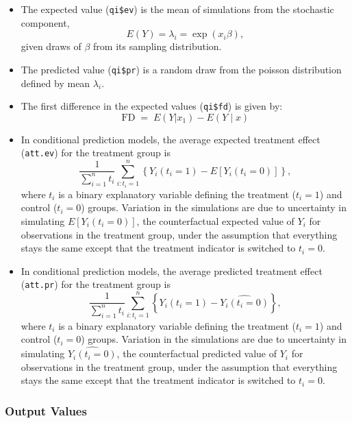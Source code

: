 \begin{itemize}
  
\item The expected value ({\tt qi\$ev}) is the mean of simulations
  from the stochastic component, $$E(Y) = \lambda_i =  \exp(x_i
  \beta),$$ given draws of $\beta$ from its sampling distribution.  
  
\item The predicted value ({\tt qi\$pr}) is a random draw from the
  poisson distribution defined by mean $\lambda_i$.

\item The first difference in the expected values ({\tt qi\$fd}) is given by:
\begin{equation*}
\textrm{FD} \; = \; E(Y | x_1) - E(Y \mid x)
\end{equation*}
\item In conditional prediction models, the average expected treatment
  effect ({\tt att.ev}) for the treatment group is 
    \begin{equation*} \frac{1}{\sum_{i=1}^n t_i}\sum_{i:t_i=1}^n \left\{ Y_i(t_i=1) -
      E[Y_i(t_i=0)] \right\},
    \end{equation*} 
    where $t_i$ is a binary explanatory variable defining the treatment
    ($t_i=1$) and control ($t_i=0$) groups.  Variation in the
    simulations are due to uncertainty in simulating $E[Y_i(t_i=0)]$,
    the counterfactual expected value of $Y_i$ for observations in the
    treatment group, under the assumption that everything stays the
    same except that the treatment indicator is switched to $t_i=0$.

\item In conditional prediction models, the average predicted treatment
  effect ({\tt att.pr}) for the treatment group is 
    \begin{equation*} \frac{1}{\sum_{i=1}^n t_i}\sum_{i:t_i=1}^n \left\{ Y_i(t_i=1) -
      \widehat{Y_i(t_i=0)} \right\},
    \end{equation*} 
    where $t_i$ is a binary explanatory variable defining the
    treatment ($t_i=1$) and control ($t_i=0$) groups.  Variation in
    the simulations are due to uncertainty in simulating
    $\widehat{Y_i(t_i=0)}$, the counterfactual predicted value of
    $Y_i$ for observations in the treatment group, under the
    assumption that everything stays the same except that the
    treatment indicator is switched to $t_i=0$.
\end{itemize}

\subsubsection{Output Values}

